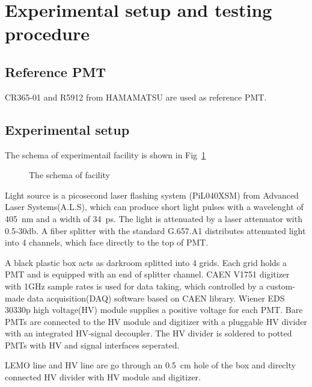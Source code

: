 \section{Experimental setup and testing procedure}
\label{SetUp}
\subsection{Reference PMT}
CR365-01\cite{BJBS} and R5912\cite{JPBS} from HAMAMATSU are used as reference PMT.
\subsection{Experimental setup}
The schema of experimentail facility is shown in Fig~\ref{fig:facility}
\begin{figure}
    \caption{The schema of facility}
    \label{fig:facility}
\end{figure}
Light source is a picosecond laser flashing system (PiL040XSM) from Advanced Laser Systems(A.L.S)\cite{NTKLaser}, which can produce short light pulses with a wavelenght of \SI{405}{nm} and a width of \SI{34}{ps}. The light is attenuated by a laser attenuator with 0.5-30db. A fiber splitter with the standard G.657.A1 distributes attenuated light into 4 channels, which face directly to the top of PMT.

A black plastic box acts as darkroom splitted into 4 grids. Each grid holds a PMT and is equipped with an end of splitter channel. CAEN V1751 digitizer with 1GHz sample rates is used for data taking\cite{CAENV1751}, which controlled by a custom-made data acquisition(DAQ) software based on CAEN library. Wiener EDS 30330p high voltage(HV) module\cite{WIENERHV} supplies a positive voltage for each PMT. Bare PMTs are connected to the HV module and digitizer with a pluggable HV divider with an integrated HV-signal decoupler. The HV divider is soldered to potted PMTs with HV and signal interfaces seperated. 

LEMO line and HV line are go through an \SI{0.5}{cm} hole of the box and direclty connected HV divider with HV module and digitizer. 